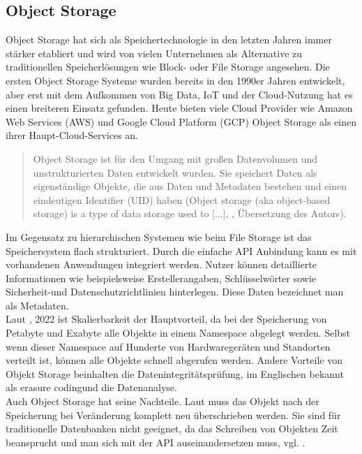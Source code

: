 \newpage

\subsection{Object Storage}

Object Storage hat sich als Speichertechnologie in den letzten Jahren immer stärker etabliert und wird von vielen Unternehmen als Alternative zu traditionellen Speicherlösungen wie Block- oder File Storage angesehen. Die ersten Object Storage Systeme wurden bereits in den 1990er Jahren entwickelt, aber erst mit dem Aufkommen von Big Data, IoT und der Cloud-Nutzung 
 hat es einen breiteren Einsatz gefunden. Heute bieten viele Cloud Provider wie Amazon Web Services (AWS) und Google Cloud Platform (GCP) Object Storage als einen ihrer Haupt-Cloud-Services an.\\
 
\begin{quote}
	Object Storage ist für den Umgang mit großen Datenvolumen und unstrukturierten Daten entwickelt wurden. Sie speichert Daten als eigenständige Objekte, die aus Daten und Metadaten bestehen und einen eindeutigen Identifier (UID) haben (\glqq Object storage (aka object-based storage) is a type of data storage used to [...]\grqq, \cite{dataCore-OS}, Übersetzung des Autors).
\end{quote}

Im Gegensatz zu hierarchischen Systemen wie beim File Storage ist das Speichersystem flach strukturiert. Durch die einfache API Anbindung kann es mit vorhandenen Anwendungen integriert werden. Nutzer können detaillierte Informationen wie beispielsweise Erstellerangaben, Schlüsselwörter sowie Sicherheit-und Datenschutzrichtlinien hinterlegen. Diese Daten bezeichnet man als Metadaten.\\

Laut \citeauthor{nx-fileScala}, 2022 ist Skalierbarkeit der Hauptvorteil, da bei der Speicherung von Petabyte und Exabyte alle Objekte in einem Namespace abgelegt werden. Selbst wenn dieser Namespace auf Hunderte von Hardwaregeräten und Standorten verteilt ist, können alle Objekte schnell abgerufen werden. Andere Vorteile von Objekt Storage beinhalten die Datenintegritätsprüfung, im Englischen bekannt als \glqq erasure coding\grqq und die Datenanalyse.\\

Auch Object Storage hat seine Nachteile. Laut \citeauthor{redHat-storage} muss das Objekt nach der Speicherung bei Veränderung komplett neu überschrieben werden. Sie sind für traditionelle Datenbanken nicht geeignet, da das Schreiben von Objekten Zeit beansprucht und man sich mit der API auseinandersetzen muss, vgl. \citeauthor{redHat-storage}.\\

